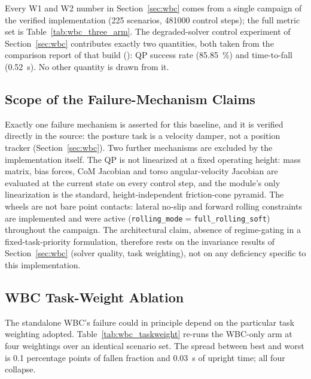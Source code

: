 \documentclass[a4paper,fleqn]{cas-dc}
\begin{document}
Every W1 and W2 number in Section~\ref{sec:wbc} comes from a single campaign of the
verified implementation (225 scenarios, \num{481000} control steps); the full
metric set is Table~\ref{tab:wbc_three_arm}. The degraded-solver control
experiment of Section~\ref{sec:wbc} contributes exactly two quantities, both taken from
the comparison report of that build
(): QP success rate
(\SI{85.85}{\percent}) and time-to-fall (\SI{0.52}{s}). No other quantity is
drawn from it.

\subsection{Scope of the Failure-Mechanism Claims}

Exactly one failure mechanism is asserted for this baseline, and it is verified
directly in the source: the posture task is a velocity damper, not a position
tracker (Section~\ref{sec:wbc}). Two further mechanisms
are excluded by the implementation itself. The QP is not linearized at a fixed operating height: mass matrix, bias forces, CoM Jacobian and torso
angular-velocity Jacobian are evaluated at the current state on every control
step, and the module's only linearization is the standard, height-independent
friction-cone pyramid. The wheels are not bare point contacts: lateral no-slip
and forward rolling constraints are implemented and were active
(\texttt{rolling\_mode}${=}$\texttt{full\_rolling\_soft}) throughout the
campaign. The architectural claim, absence of regime-gating in a fixed-task-priority formulation, therefore rests on the invariance results of
Section~\ref{sec:wbc} (solver quality, task weighting), not on any deficiency specific
to this implementation.

\subsection{WBC Task-Weight Ablation}

The standalone WBC's failure could in principle depend on the particular task
weighting adopted. Table~\ref{tab:wbc_taskweight} re-runs
the WBC-only arm at four weightings over an identical scenario set. The spread
between best and worst is \num{0.1} percentage points of fallen fraction and
\SI{0.03}{s} of upright time; all four collapse.
\end{document}
